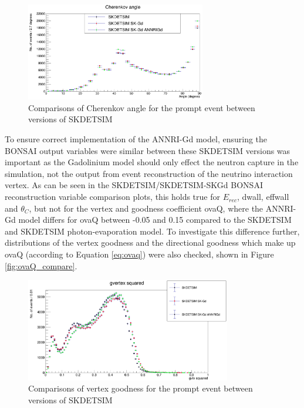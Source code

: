 \begin{figure}
    \centering
    \includegraphics[width=0.7\textwidth]{Figures/thetaC_compare.png}
    \caption{Comparisons of Cherenkov angle for the prompt event between versions of SKDETSIM}
    \label{fig:thetaC_compare}

\end{figure}


To ensure correct implementation of the ANNRI-Gd model, ensuring the BONSAI output variables were similar between these SKDETSIM versions was important as the Gadolinium model should only effect the neutron capture in the simulation, not the output from event reconstruction of the neutrino interaction vertex. As can be seen in the SKDETSIM/SKDETSIM-SKGd BONSAI reconstruction variable comparison plots, this holds true for $E_{rec}$, dwall, effwall and $\theta_C$, but not for the vertex and goodness coefficient ovaQ, where the ANNRI-Gd model differs for ovaQ between -0.05 and 0.15 compared to the SKDETSIM and SKDETSIM photon-evaporation model. To investigate this difference further, distributions of the vertex goodness and the directional goodness which make up ovaQ (according to Equation \ref{eq:ovaq}) were also checked, shown in Figure \ref{fig:ovaQ_compare}.



\begin{figure}
    \centering
    \includegraphics[width=0.8\textwidth]{Figures/gvtx_squared.PNG}
    \caption{Comparisons of vertex goodness for the prompt event between versions of SKDETSIM}
    \label{fig:gvtx_squared}

\end{figure}

